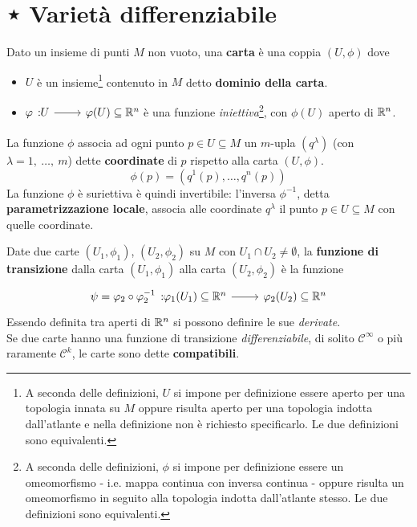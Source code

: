 \section{⋆ Varietà differenziabile}
\begin{define}
	Dato un insieme di punti $M$ non vuoto, una \textbf{carta} è una coppia $\left(U,\phi\right)$ dove
	\begin{itemize}
		\item $U$ è un insieme\footnote{A seconda delle definizioni, $U$ si impone per definizione essere aperto per una topologia innata su $M$ oppure risulta aperto per una topologia indotta dall'atlante e nella definizione non è richiesto specificarlo. Le due definizioni sono equivalenti.} contenuto in $M$ detto \textbf{dominio della carta}.
		\item $\funz[\phi]{U}{\phi(U)\subseteq \realset^n}$ è una funzione \textit{iniettiva}\footnote{A seconda delle definizioni, $\phi$ si impone per definizione essere un omeomorfismo - i.e. mappa continua con inversa continua - oppure risulta un omeomorfismo in seguito alla topologia indotta dall'atlante stesso. Le due definizioni sono equivalenti.}, con $\phi(U)$ aperto di $\mathbb{R}^n$.
	\end{itemize}
	La funzione $\phi$ associa ad ogni punto $p\in U\subseteq M$ un $m$-upla $\left(q^{\lambda}\right)$ (con $\lambda=1,\ \ldots,\ m$) dette \textbf{coordinate} di $p$ rispetto alla carta $\left(U,\phi\right)$.
	\begin{equation}
		\phi\left(p\right)=\left(q^1\left(p\right),\ldots,q^n\left(p\right)\right)
	\end{equation}
	La funzione $\phi$ è suriettiva è quindi invertibile: l'inversa $\phi^{-1}$, detta  \textbf{parametrizzazione locale}, associa alle coordinate $q^{\lambda}$ il punto $p\in U\subseteq M$ con quelle coordinate.
\end{define}
\begin{define}
	Date due carte $\left(U_1,\phi_1\right)$, $\left(U_2,\phi_2\right)$ su $M$ con $U_1\cap U_2\neq \emptyset$, la \textbf{funzione di transizione} dalla carta $\left(U_1,\phi_1\right)$ alla carta $\left(U_2,\phi_2\right)$ è la funzione
	\begin{equation}
		\funz[\psi=\phi_2\circ\phi_2^{-1}]{\phi_1(U_1)\subseteq\realset^{n}}{\phi_2(U_2)\subseteq\realset^{n}}
	\end{equation}
	Essendo definita tra aperti di $\mathbb{R}^n$ si possono definire le sue \textit{derivate}.\\
	Se due carte hanno una funzione di transizione \textit{differenziabile}, di solito $\mathcal{C}^{\infty}$ o più raramente $\mathcal{C}^{k}$, le carte sono dette \textbf{compatibili}.
\end{define}
